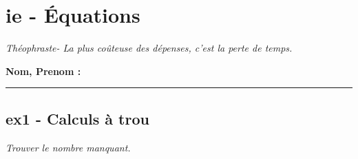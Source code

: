 \documentclass[12pt]{article}
\newcommand{\horrule}[1]{\rule{\linewidth}{#1}} %
\begin{document}

\newtheorem{Definition}{Définition}
\newtheorem{Theorem}{Théorème}
\newtheorem{Proposition}{Propriété}

\renewcommand{\labelitemi}{$\bullet$}
\renewcommand{\labelitemii}{$\circ$}

\setlength{\columnseprule}{1pt}

\section*{ie - Équations}
\begin{center}
  \textit{Théophraste- La plus coûteuse des dépenses, c’est la perte de temps.}
\end{center}
\textbf{Nom, Prenom :}\\
\horrule{2px}

\subsection*{ex1 - Calculs  à trou}
\textit{Trouver le nombre manquant.}
\end{document}
